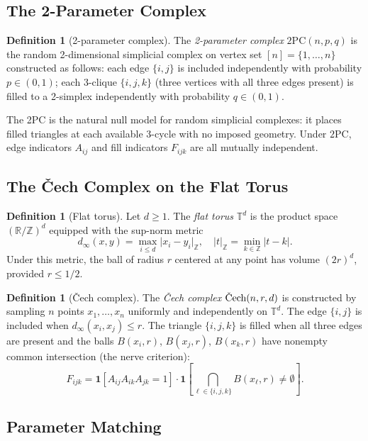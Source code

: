 \documentclass[reqno,12pt]{amsart}
\newcommand{\PC}{\mathrm{2PC}}
\newcommand{\Cech}{\ifmmode\text{\v{C}ech}\else\v{C}ech\fi}  %
\newcommand{\TT}{\mathbb{T}}         %
\newcommand{\RR}{\mathbb{R}}
\newcommand{\ZZ}{\mathbb{Z}}
\theoremstyle{plain}
\theoremstyle{definition}
\newtheorem{definition}[theorem]{Definition}
\theoremstyle{remark}
\begin{document}
\subsection{The 2-Parameter Complex}

\begin{definition}[2-parameter complex]
The \emph{2-parameter complex} $\PC(n,p,q)$ is the random 2-dimensional simplicial complex
on vertex set $[n] = \{1,\ldots,n\}$ constructed as follows: each edge $\{i,j\}$ is included
independently with probability $p\in(0,1)$; each 3-clique $\{i,j,k\}$ (three vertices with
all three edges present) is filled to a 2-simplex independently with probability $q\in(0,1)$.
\end{definition}

The 2PC is the natural null model for random simplicial complexes: it places filled triangles
at each available 3-cycle with no imposed geometry. Under $\PC$, edge indicators $A_{ij}$
and fill indicators $F_{ijk}$ are all mutually independent.

\subsection{The \v{C}ech Complex on the Flat Torus}

\begin{definition}[Flat torus]\label{def:torus}
Let $d\geq 1$. The \emph{flat torus} $\TT^d$ is the product space $(\RR/\ZZ)^d$ equipped
with the sup-norm metric
\[
  d_\infty(x,y) = \max_{i\leq d}\lvert x_i - y_i\rvert_\ZZ,
  \quad \lvert t\rvert_\ZZ = \min_{k\in\ZZ}\lvert t - k\rvert.
\]
Under this metric, the ball of radius $r$ centered at any point has volume $(2r)^d$,
provided $r \leq 1/2$.
\end{definition}

\begin{definition}[\v{C}ech complex]\label{def:cech}
The \emph{\v{C}ech complex} $\Cech(n,r,d)$ is constructed by sampling $n$ points
$x_1,\ldots,x_n$ uniformly and independently on $\TT^d$. The edge $\{i,j\}$ is included
when $d_\infty(x_i,x_j)\leq r$. The triangle $\{i,j,k\}$ is filled when all three edges are
present and the balls $B(x_i,r)$, $B(x_j,r)$, $B(x_k,r)$ have nonempty common intersection
(the nerve criterion):
\[
  F_{ijk} = \mathbf{1}\!\left[A_{ij}A_{ik}A_{jk} = 1\right]\cdot
  \mathbf{1}\!\left[\bigcap_{\ell\in\{i,j,k\}} B(x_\ell,r) \neq \emptyset\right].
\]
\end{definition}

\subsection{Parameter Matching}
\end{document}
